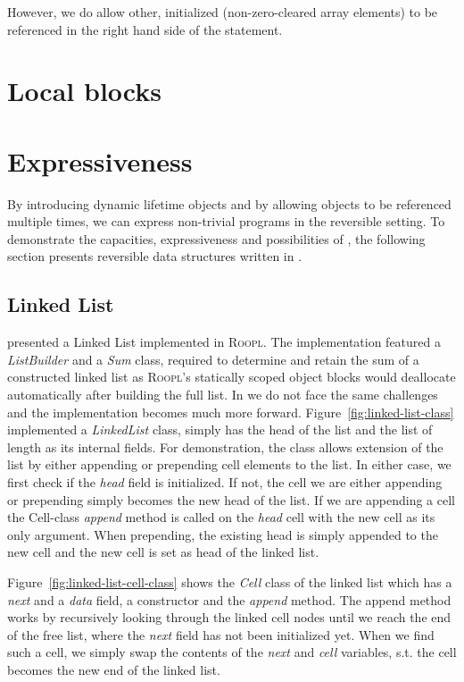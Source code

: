 However, we do allow other, initialized (non-zero-cleared array elements) to be referenced in the right hand side of the statement.

\section{Local blocks}
\label{sec:local-blocks}


\section{\rooplpp Expressiveness}
\label{sec:rooplpp-expressiveness}
By introducing dynamic lifetime objects and by allowing objects to be referenced multiple times, we can express non-trivial programs in the reversible setting. To demonstrate the capacities, expressiveness and possibilities of \rooplpp, the following section presents reversible data structures written in \rooplpp.

\subsection{Linked List}
\label{subsec:linked-list}
\citeauthor{th:roopl} presented a Linked List implemented in \textsc{Roopl}. The implementation featured a \textit{ListBuilder} and a \textit{Sum} class, required to determine and retain the sum of a constructed linked list as \textsc{Roopl}'s statically scoped object blocks would deallocate automatically after building the full list. In \rooplpp we do not face the same challenges and the implementation becomes much more forward. Figure~\ref{fig:linked-list-class} implemented a \textit{LinkedList} class, simply has the head of the list and the list of length as its internal fields. For demonstration, the class allows extension of the list by either appending or prepending cell elements to the list. In either case, we first check if the \textit{head} field is initialized. If not, the cell we are either appending or prepending simply becomes the new head of the list. If we are appending a cell the Cell-class \textit{append} method is called on the \textit{head} cell with the new cell as its only argument. When prepending, the existing head is simply appended to the new cell and the new cell is set as head of the linked list.

Figure~\ref{fig:linked-list-cell-class} shows the \textit{Cell} class of the linked list which has a \textit{next} and a \textit{data} field, a constructor and the \textit{append} method. The append method works by recursively looking through the linked cell nodes until we reach the end of the free list, where the \textit{next} field has not been initialized yet. When we find such a cell, we simply swap the contents of the \textit{next} and \textit{cell} variables, s.t. the cell becomes the new end of the linked list. 

